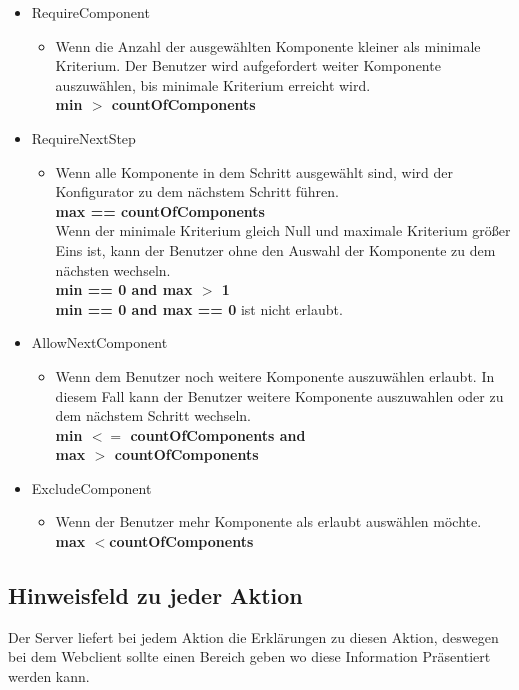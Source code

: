 \documentclass{article}
\begin{document}
\begin{itemize}
    \item RequireComponent 
    \begin{itemize}
        \item Wenn die Anzahl der ausgew\"ahlten Komponente kleiner als minimale
        Kriterium. Der Benutzer wird aufgefordert weiter Komponente
        auszuw\"ahlen, bis minimale Kriterium erreicht wird.\\
        \textbf{min $>$ countOfComponents}
    \end{itemize}
    \item RequireNextStep
        \begin{itemize}
            \item Wenn alle Komponente in dem Schritt ausgew\"ahlt sind, wird
            der Konfigurator zu dem n\"achstem Schritt f\"uhren.\\
            \textbf{max == countOfComponents}\\
            Wenn der minimale Kriterium gleich Null und maximale Kriterium
            gr\"o\ss{}er Eins ist, kann der Benutzer ohne den Auswahl der
            Komponente zu dem n\"achsten wechseln.\\
            \textbf{min == 0 and max $>$ 1}\\
            \textbf{min == 0 and max == 0} ist nicht erlaubt.
        \end{itemize}
    \item AllowNextComponent
    \begin{itemize}
        \item  Wenn dem Benutzer noch weitere Komponente auszuw\"ahlen erlaubt.
        In diesem Fall kann der Benutzer weitere Komponente auszuwahlen oder zu
        dem n\"achstem Schritt wechseln.\\
        \textbf{min $<=$ countOfComponents and\\ max $>$ countOfComponents}
    \end{itemize}
\item ExcludeComponent
    \begin{itemize}
        \item Wenn der Benutzer mehr Komponente als erlaubt ausw\"ahlen
        möchte.\\
        \textbf{max $<$countOfComponents}
    \end{itemize}
\end{itemize}

\subsection{Hinweisfeld zu jeder Aktion}
Der Server liefert bei jedem Aktion die Erklärungen zu diesen Aktion, deswegen
bei dem Webclient sollte einen Bereich geben wo diese Information Präsentiert
werden kann.
\end{document}

